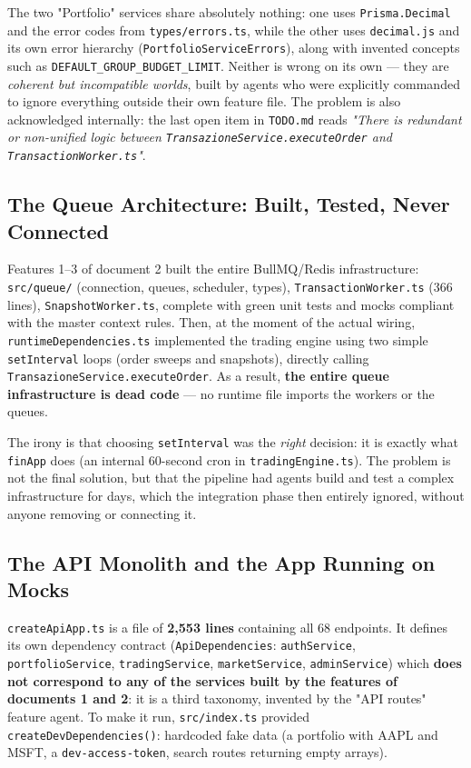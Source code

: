 \documentclass[11pt,a4paper]{article}
\newcommand{\file}[1]{\texttt{\small #1}}
\begin{document}
	The two "Portfolio" services share absolutely nothing: one uses \file{Prisma.Decimal} and the error codes from \file{types/errors.ts}, while the other uses \file{decimal.js} and its own error hierarchy (\file{PortfolioServiceErrors}), along with invented concepts such as \file{DEFAULT\_GROUP\_BUDGET\_LIMIT}. Neither is wrong on its own --- they are \emph{coherent but incompatible worlds}, built by agents who were explicitly commanded to ignore everything outside their own feature file. The problem is also acknowledged internally: the last open item in \file{TODO.md} reads \emph{"There is redundant or non-unified logic between \file{TransazioneService.executeOrder} and \file{TransactionWorker.ts}"}.
	
	\subsection{The Queue Architecture: Built, Tested, Never Connected}
	
	Features 1--3 of document 2 built the entire BullMQ/Redis infrastructure: \file{src/queue/} (connection, queues, scheduler, types), \file{TransactionWorker.ts} (366 lines), \file{SnapshotWorker.ts}, complete with green unit tests and mocks compliant with the master context rules. Then, at the moment of the actual wiring, \file{runtimeDependencies.ts} implemented the trading engine using two simple \file{setInterval} loops (order sweeps and snapshots), directly calling \file{TransazioneService.executeOrder}. As a result, \textbf{the entire queue infrastructure is dead code} --- no runtime file imports the workers or the queues.
	
	The irony is that choosing \file{setInterval} was the \emph{right} decision: it is exactly what \file{finApp} does (an internal 60-second cron in \file{tradingEngine.ts}). The problem is not the final solution, but that the pipeline had agents build and test a complex infrastructure for days, which the integration phase then entirely ignored, without anyone removing or connecting it.
	
	\subsection{The API Monolith and the App Running on Mocks}
	
	\file{createApiApp.ts} is a file of \textbf{2,553 lines} containing all 68 endpoints. It defines its own dependency contract (\file{ApiDependencies}: \file{authService}, \file{portfolioService}, \file{tradingService}, \file{marketService}, \file{adminService}) which \textbf{does not correspond to any of the services built by the features of documents 1 and 2}: it is a third taxonomy, invented by the "API routes" feature agent. To make it run, \file{src/index.ts} provided \file{createDevDependencies()}: hardcoded fake data (a portfolio with AAPL and MSFT, a \file{dev-access-token}, search routes returning empty arrays).
	
\end{document}
